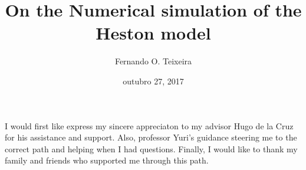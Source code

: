 \documentclass[12pt,twoside]{reedthesis}
\title{\textbf{\Huge{On the Numerical simulation of the \\[20pt] Heston model}}}
\author{Fernando O. Teixeira}
\date{outubro 27, 2017}
\theoremstyle{definition}
\theoremstyle{definition}
\theoremstyle{remark}
\begin{document}
      \maketitle
  
  \frontmatter %
  \pagestyle{empty} %
      \begin{acknowledgements}
      I would first like express my sincere appreciaton to my advisor Hugo de
      la Cruz for his assistance and support. Also, professor Yuri's guidance
      steering me to the correct path and helping when I had questions.
      Finally, I would like to thank my family and friends who supported me
      through this path.
      \textbf{\\ \\ \\ \\ \\ \\ \\ \\ \\ \\ \\ \\ \\ \\ \\ \\ \\ \\ \\ \\ \\ \\ \\ \\ \\ \\ \\ \\ \\ \\ \\ \\ \\ \\ \\ \\ \\ \\ \\ \\ \\ \\ \\ \\ \\ \\ \\ \\ \\ \\ \\ \\ \\ \\ \\ \\ \\ \\ \\ \\ \\ \\ \\ }
\end{acknowledgements}
\end{document}
